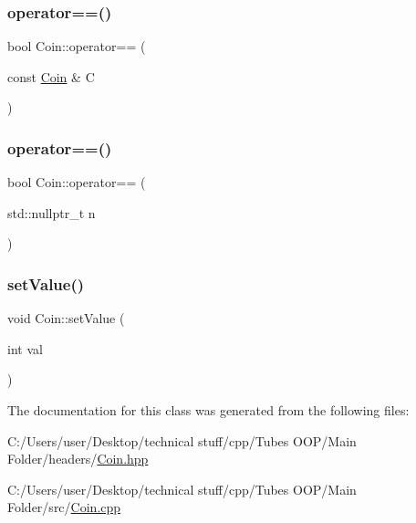 \subsubsection{\texorpdfstring{operator==()}{operator==()}\hspace{0.1cm}{\footnotesize\ttfamily [1/2]}}
{\footnotesize\ttfamily bool Coin\+::operator== (\begin{DoxyParamCaption}\item[{const \mbox{\hyperlink{class_coin}{Coin}} \&}]{C }\end{DoxyParamCaption})}

\mbox{\label{class_coin_a20ef59bfc867081e452d38daded77e08}} 
\subsubsection{\texorpdfstring{operator==()}{operator==()}\hspace{0.1cm}{\footnotesize\ttfamily [2/2]}}
{\footnotesize\ttfamily bool Coin\+::operator== (\begin{DoxyParamCaption}\item[{std\+::nullptr\+\_\+t}]{n }\end{DoxyParamCaption})}

\mbox{\label{class_coin_a87813c8eef4d59ef8136b0cc651a80de}} 
\subsubsection{\texorpdfstring{set\+Value()}{setValue()}}
{\footnotesize\ttfamily void Coin\+::set\+Value (\begin{DoxyParamCaption}\item[{int}]{val }\end{DoxyParamCaption})}



The documentation for this class was generated from the following files\+:\begin{DoxyCompactItemize}
\item 
C\+:/\+Users/user/\+Desktop/technical stuff/cpp/\+Tubes O\+O\+P/\+Main Folder/headers/\mbox{\hyperlink{_coin_8hpp}{Coin.\+hpp}}\item 
C\+:/\+Users/user/\+Desktop/technical stuff/cpp/\+Tubes O\+O\+P/\+Main Folder/src/\mbox{\hyperlink{_coin_8cpp}{Coin.\+cpp}}\end{DoxyCompactItemize}
